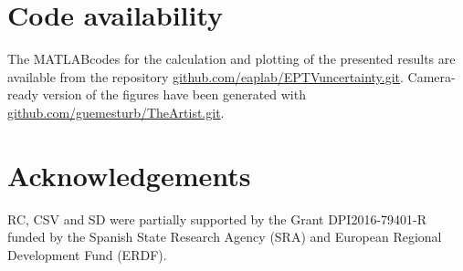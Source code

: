 \section*{Code availability}
{The MATLAB\textregistered  codes for the calculation and plotting of the presented results are available from the repository \url{github.com/eaplab/EPTVuncertainty.git}. Camera-ready version of the figures have been generated with \url{github.com/guemesturb/TheArtist.git}.}

\section*{Acknowledgements}
RC, CSV and SD were partially supported by the Grant DPI2016-79401-R funded by the Spanish State Research Agency (SRA) and European Regional Development Fund (ERDF).